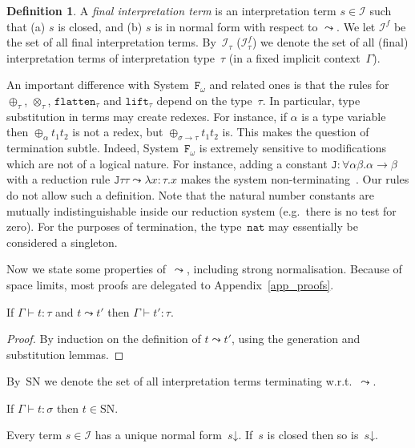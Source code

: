 \documentclass[a4paper,UKenglish,cleveref,autoref,numberwithinsect]{lipics-v2019}
\theoremstyle{definition}
\newtheorem{defn}[theorem]{Definition}
\newcommand{\Fomega}{\mathtt{F}_\omega}
\newcommand{\Iterms}{\mathcal{I}}
\newcommand{\arrtype}{\rightarrow}
\newcommand{\arrW}{\leadsto}
\newcommand{\nat}{\mathtt{nat}}
\newcommand{\flatten}{\mathtt{flatten}}
\newcommand{\lift}{\mathtt{lift}}
\newcommand{\da}{\mathord{\downarrow}}
\newcommand{\SN}{\mathrm{SN}}
\newcommand{\proves}{\vdash}
\begin{document}
\begin{defn}
  A \emph{final interpretation term} is an interpretation term $s \in
  \Iterms$ such that (a) $s$ is closed, and (b) $s$ is in normal form
  with respect to $\arrW$.  We let $\Iterms^f$ be the set of all final
  interpretation terms. By~$\Iterms_\tau$ ($\Iterms^f_\tau$) we denote
  the set of all (final) interpretation terms of interpretation
  type~$\tau$ (in a fixed implicit context~$\Gamma$).
\end{defn}

An important difference with System~$\Fomega$ and related ones is that
the rules for $\oplus_\tau$, $\otimes_\tau$, $\flatten_\tau$ and
$\lift_\tau$ depend on the type~$\tau$. In particular, type
substitution in terms may create redexes. For instance, if $\alpha$ is
a type variable then $\oplus_\alpha t_1 t_2$ is not a redex, but
$\oplus_{\sigma\arrtype\tau} t_1 t_2$ is. This makes the question of
termination subtle. Indeed, System~$\Fomega$ is extremely sensitive to
modifications which are not of a logical nature. For instance, adding
a constant $\mathtt{J} : \forall \alpha \beta . \alpha \arrtype \beta$
with a reduction rule $\mathtt{J} \tau \tau \leadsto \lambda x : \tau
. x$ makes the system non-terminating~\cite{Girard1971}. Our rules do
not allow such a definition. Note that the natural number constants
are mutually indistinguishable inside our reduction system (e.g.~there
is no test for zero). For the purposes of termination, the type~$\nat$
may essentially be considered a singleton.

Now we state some properties of~$\arrW$, including strong
normalisation. Because of space limits, most proofs are delegated to
Appendix~\ref{app_proofs}.

\begin{lemma}
  If $\Gamma \proves t : \tau$ and $t \arrW t'$ then $\Gamma \proves
  t' : \tau$.
\end{lemma}

\begin{proof}
  By induction on the definition of $t \arrW t'$, using the
  generation and substitution lemmas.
\end{proof}

By~$\SN$ we denote the set of all interpretation terms terminating
w.r.t.~$\arrW$.

\begin{theorem}\label{thm_sn}
  If $\Gamma \proves t : \sigma$ then $t \in \SN$.
\end{theorem}

\begin{lemma}\label{lem_unique_final}
  Every term $s \in \Iterms$ has a unique normal form~$s\da$. If~$s$
  is closed then so is~$s\da$.
\end{lemma}
\end{document}
